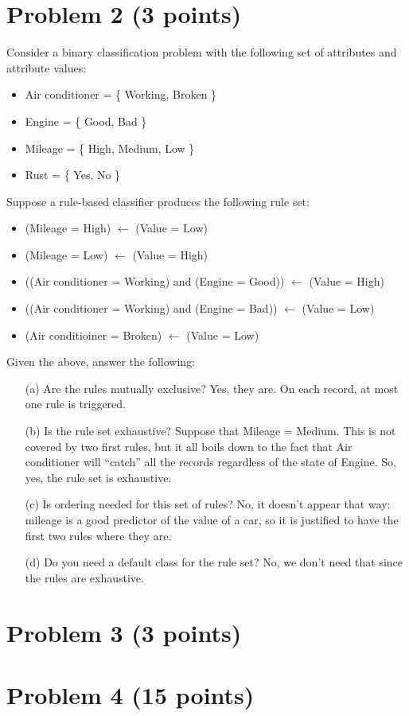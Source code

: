\documentclass[10pt]{article}
\begin{document}
\section*{Problem 2 (3 points)}
Consider a binary classification problem with the following set of attributes and attribute values:
\begin{itemize}
  \item Air conditioner = \{ Working, Broken \}
  \item Engine = \{ Good, Bad \}
  \item Mileage = \{ High, Medium, Low \}
  \item Rust = \{ Yes, No \}
\end{itemize}
Suppose a rule-based classifier produces the following rule set:
\begin{itemize}
  \item (Mileage = High) $\leftarrow$ (Value = Low)
  \item (Mileage = Low) $\leftarrow$ (Value = High)
  \item ((Air conditioner = Working) and (Engine = Good)) $\leftarrow$ (Value = High)
  \item ((Air conditioner = Working) and (Engine = Bad)) $\leftarrow$ (Value = Low)
  \item (Air conditioiner = Broken) $\leftarrow$ (Value = Low)
\end{itemize}
Given the above, answer the following:
\begin{enumerate}
  \item[(a)] Are the rules mutually exclusive?
  \color{black} Yes, they are. On each record, at most one rule is triggered.
  
  \color{blue}
  \item[(b)] Is the rule set exhaustive? 
  \color{black} Suppose that Mileage = Medium. This is not covered by two first rules, but it all boils down to the fact that Air conditioner will ``catch'' all the records regardless of the state of Engine. So, yes, the rule set is exhaustive.

  \color{blue}
  \item[(c)] Is ordering needed for this set of rules?
  \color{black} No, it doesn't appear that way: mileage is a good predictor of the value of a car, so it is justified to have the first two rules where they are.
  
  \color{blue}
  \item[(d)] Do you need a default class for the rule set?
  \color{black}
  No, we don't need that since the rules are exhaustive.
\end{enumerate}

\color{blue}
\section*{Problem 3 (3 points)}

\color{blue}
\section*{Problem 4 (15 points)}
\end{document}
